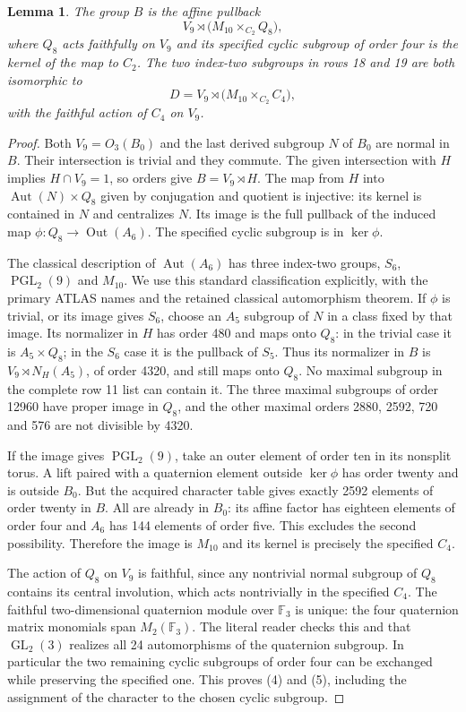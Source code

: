 \documentclass[11pt,a4paper]{article}
\newtheorem{lemma}{Lemma}\newtheorem{theorem}{Theorem}
\begin{document}
\begin{lemma}\label{B}
The group $B$ is the affine pullback
\[
 V_9\rtimes\bigl(M_{10}\mathbin{\times}_{C_2}Q_8\bigr),     \tag{4}
\]
where $Q_8$ acts faithfully on $V_9$ and its specified cyclic subgroup
of order four is the kernel of the map to $C_2$. The two index-two
subgroups in rows 18 and 19 are both isomorphic to
\[
 D=V_9\rtimes\bigl(M_{10}\mathbin{\times}_{C_2}C_4\bigr),  \tag{5}
\]
with the faithful action of $C_4$ on $V_9$.
\end{lemma}
\begin{proof}
Both $V_9=O_3(B_0)$ and the last derived subgroup $N$ of $B_0$ are
normal in $B$. Their intersection is trivial and they commute.
The given intersection with $H$ implies $H\cap V_9=1$, so orders
give $B=V_9\rtimes H$. The map from $H$ into
$\operatorname{Aut}(N)\times Q_8$ given by conjugation and quotient
is injective: its kernel is contained in $N$ and centralizes $N$.
Its image is the full pullback of the induced map
$\phi:Q_8\longrightarrow\operatorname{Out}(A_6)$.
The specified cyclic subgroup is in $\ker\phi$.

The classical description of $\operatorname{Aut}(A_6)$ has three
index-two groups, $S_6$, $\operatorname{PGL}_2(9)$ and $M_{10}$.
We use this standard classification explicitly, with the primary
ATLAS names and the retained classical automorphism theorem.
If $\phi$ is trivial, or its image gives $S_6$, choose an $A_5$
subgroup of $N$ in a class fixed by that image. Its normalizer in
$H$ has order 480 and maps onto $Q_8$: in the trivial case it is
$A_5\times Q_8$; in the $S_6$ case it is the pullback of $S_5$.
Thus its normalizer in $B$ is $V_9\rtimes N_H(A_5)$, of order 4320,
and still maps onto $Q_8$. No maximal subgroup in the complete
row 11 list can contain it. The three maximal subgroups of order
12960 have proper image in $Q_8$, and the other maximal orders
2880, 2592, 720 and 576 are not divisible by 4320.

If the image gives $\operatorname{PGL}_2(9)$, take an outer element
of order ten in its nonsplit torus. A lift paired with a quaternion
element outside $\ker\phi$ has order twenty and is outside $B_0$.
But the acquired character table gives exactly 2592 elements of
order twenty in $B$. All are already in $B_0$: its affine factor
has eighteen elements of order four and $A_6$ has 144 elements
of order five. This excludes the second possibility. Therefore
the image is $M_{10}$ and its kernel is precisely the specified
$C_4$.

The action of $Q_8$ on $V_9$ is faithful, since any nontrivial normal
subgroup of $Q_8$ contains its central involution, which acts
nontrivially in the specified $C_4$. The faithful two-dimensional
quaternion module over $\mathbb F_3$ is unique: the four quaternion
matrix monomials span $M_2(\mathbb F_3)$. The literal reader checks
this and that $\operatorname{GL}_2(3)$ realizes all 24 automorphisms
of the quaternion subgroup. In particular the two remaining cyclic
subgroups of order four can be exchanged while preserving the
specified one. This proves (4) and (5), including the assignment
of the character to the chosen cyclic subgroup.
\end{proof}
\end{document}
